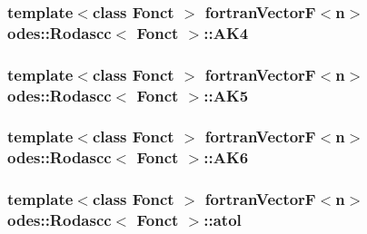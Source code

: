 \hypertarget{classodes_1_1Rodascc_a8327b2510de771a0f707b53ef526cd1d}{
\subsubsection[{A\-K4}]{\setlength{\rightskip}{0pt plus 5cm}template$<$class Fonct $>$ {\bf fortran\-Vector\-F}$<${\bf n}$>$ {\bf odes\-::\-Rodascc}$<$ Fonct $>$\-::A\-K4\hspace{0.3cm}{\ttfamily [private]}}}\label{classodes_1_1Rodascc_a8327b2510de771a0f707b53ef526cd1d}
\hypertarget{classodes_1_1Rodascc_a4ed90a9a89c16d5d0439c523c834111b}{
\subsubsection[{A\-K5}]{\setlength{\rightskip}{0pt plus 5cm}template$<$class Fonct $>$ {\bf fortran\-Vector\-F}$<${\bf n}$>$ {\bf odes\-::\-Rodascc}$<$ Fonct $>$\-::A\-K5\hspace{0.3cm}{\ttfamily [private]}}}\label{classodes_1_1Rodascc_a4ed90a9a89c16d5d0439c523c834111b}
\hypertarget{classodes_1_1Rodascc_a50abe1f3ab06dac6f4e481e01c6cbb11}{
\subsubsection[{A\-K6}]{\setlength{\rightskip}{0pt plus 5cm}template$<$class Fonct $>$ {\bf fortran\-Vector\-F}$<${\bf n}$>$ {\bf odes\-::\-Rodascc}$<$ Fonct $>$\-::A\-K6\hspace{0.3cm}{\ttfamily [private]}}}\label{classodes_1_1Rodascc_a50abe1f3ab06dac6f4e481e01c6cbb11}
\hypertarget{classodes_1_1Rodascc_a1c99d03d3c774ad4d0ee434d60e68865}{
\subsubsection[{atol}]{\setlength{\rightskip}{0pt plus 5cm}template$<$class Fonct $>$ {\bf fortran\-Vector\-F}$<${\bf n}$>$ {\bf odes\-::\-Rodascc}$<$ Fonct $>$\-::atol\hspace{0.3cm}{\ttfamily [private]}}}\label{classodes_1_1Rodascc_a1c99d03d3c774ad4d0ee434d60e68865}
